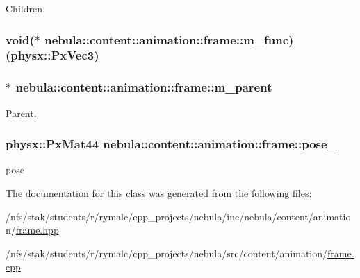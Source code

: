 Children. \hypertarget{classnebula_1_1content_1_1animation_1_1frame_a2464ca0f328687c70a552b6887962109}{
\subsubsection[{m\_\-func}]{\setlength{\rightskip}{0pt plus 5cm}void($\ast$ {\bf nebula::content::animation::frame::m\_\-func})(physx::PxVec3)}}
\label{classnebula_1_1content_1_1animation_1_1frame_a2464ca0f328687c70a552b6887962109}
\hypertarget{classnebula_1_1content_1_1animation_1_1frame_a27a0d6f520afb2ebecd58cc9ccf3ea3b}{
\subsubsection[{m\_\-parent}]{$\ast$ {\bf nebula::content::animation::frame::m\_\-parent}}}
\label{classnebula_1_1content_1_1animation_1_1frame_a27a0d6f520afb2ebecd58cc9ccf3ea3b}


Parent. \hypertarget{classnebula_1_1content_1_1animation_1_1frame_aae4b473bf2a55c2a76b205cffdeb1b26}{
\subsubsection[{pose\_\-}]{\setlength{\rightskip}{0pt plus 5cm}physx::PxMat44 {\bf nebula::content::animation::frame::pose\_\-}}}
\label{classnebula_1_1content_1_1animation_1_1frame_aae4b473bf2a55c2a76b205cffdeb1b26}


pose 

The documentation for this class was generated from the following files:\begin{DoxyCompactItemize}
\item 
/nfs/stak/students/r/rymalc/cpp\_\-projects/nebula/inc/nebula/content/animation/\hyperlink{frame_8hpp}{frame.hpp}\item 
/nfs/stak/students/r/rymalc/cpp\_\-projects/nebula/src/content/animation/\hyperlink{frame_8cpp}{frame.cpp}\end{DoxyCompactItemize}
